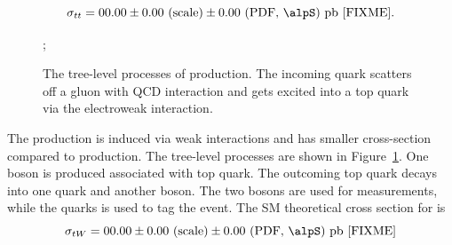 \begin{equation}
    \sigma_{tt} = 00.00 \pm 0.00 \text{~(scale)} \pm 0.00 \text{~(PDF, \alpS)~pb [FIXME]} .
\end{equation}



\begin{figure}[ht]
    \centering
    ; \qquad
    \caption{The tree-level processes of \tW production. The incoming \PQb quark scatters off a gluon with QCD interaction and gets excited into a top quark via the electroweak interaction.}
    \label{fig:physics:ppCollision:tw}
\end{figure}
\noindent The \tW production is induced via weak interactions and has smaller cross-section compared to \ttbar production. The tree-level \tW processes are shown in Figure~\ref{fig:physics:ppCollision:tw}. One \PW boson is produced associated with top quark. The outcoming top quark decays into one \PQb quark and another \PW boson. The two \PW bosons are used for \PW measurements, while the \PQb quarks is used to tag the \tW event. The SM theoretical cross section for \tW is 
\begin{equation}
    \sigma_{tW} = 00.00 \pm 0.00 \text{~(scale)} \pm 0.00 \text{~(PDF, \alpS)~pb [FIXME]}
\end{equation}


